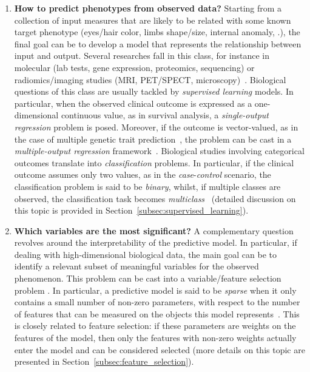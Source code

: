 \begin{enumerate}
	
	\item[] \textbf{How to predict phenotypes from observed data?}
	Starting from a collection of input measures that are likely to be related with some known target phenotype (\eg eyes/hair color, limbs shape/size, internal anomaly, \etc.), the final goal can be to develop a model that represents the relationship between input and output. Several researches fall in this class, for instance in molecular (\eg lab tests, gene expression, proteomics, sequencing) \cite{angermueller2016deep, okser2014regularized, abraham2013performance} or radiomics/imaging studies (\eg \ac{MRI}, \ac{PET}/\ac{SPECT}, microscopy)~\cite{min2016deep, helmstaedter2013connectomic}. Biological questions of this class are usually tackled by \textit{supervised learning} models. In particular, when the observed clinical outcome is expressed as a one-dimensional continuous value, as in survival analysis, a \textit{single-output regression} problem is posed. Moreover, if the outcome is vector-valued, as in the case of multiple genetic trait prediction~\cite{he2016novel}, the problem can be cast in a \textit{multiple-output regression }framework~\cite{baldassarre2012multi, argyriou2008convex}. Biological studies involving categorical outcomes translate into \textit{classification} problems. In particular, if the clinical outcome assumes only two values, as in the \textit{case}-\textit{control} scenario, the classification problem is said to be \textit{binary}, whilst, if multiple classes are observed, the classification task becomes \textit{multiclass}~\cite{Yuan2016DeepGeneAA, ancona2005regularized} (detailed discussion on this topic is provided in Section~\ref{subsec:supervised_learning}).
	
	\item[] \textbf{Which variables are the most significant?}
	A complementary question revolves around the interpretability of the predictive model. In particular, if dealing with high-dimensional biological data, the main goal can be to identify a relevant subset of meaningful variables for the observed phenomenon. This problem can be cast into a variable/feature selection problem \cite{guyon2002gene}. %
	In particular, a predictive model is said to be \textit{sparse} when it only contains a small number of non-zero parameters, with respect to the number of features that can be measured on the objects this model represents~\cite{hastie2015statistical, meier2008group}. This is closely related to feature selection: if these parameters are weights on the features of the model, then only the features with non-zero weights actually enter the model and can be considered selected (more details on this topic are presented in Section~\ref{subsec:feature_selection}).
	

\end{enumerate}
